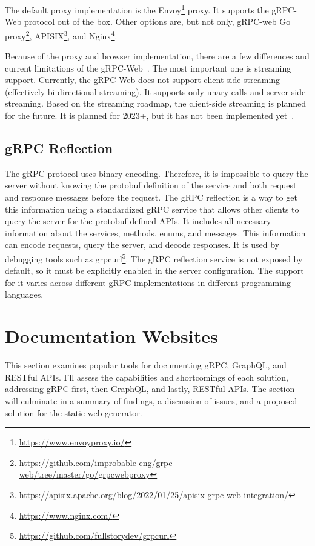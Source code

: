 The default proxy implementation is the Envoy\footnote{\url{https://www.envoyproxy.io/}} proxy.
It supports the gRPC-Web protocol out of the box.
Other options are, but not only, gRPC-web Go proxy\footnote{\url{https://github.com/improbable-eng/grpc-web/tree/master/go/grpcwebproxy}}, APISIX\footnote{\url{https://apisix.apache.org/blog/2022/01/25/apisix-grpc-web-integration/}}, and Nginx\footnote{\url{https://www.nginx.com/}}.

Because of the proxy and browser implementation, there are a few differences and current limitations of the gRPC-Web~\cite{grpc-web}.
The most important one is streaming support.
Currently, the gRPC-Web does not support client-side streaming (effectively bi-directional streaming).
It supports only unary calls and server-side streaming.
Based on the streaming roadmap, the client-side streaming is planned for the future.
It is planned for 2023+, but it has not been implemented yet~\cite{grpc-web-streaming-roadmap}.

\subsection{gRPC Reflection}
The gRPC protocol uses binary encoding.
Therefore, it is impossible to query the server without knowing the protobuf definition of the service and both request and response messages before the request.
The gRPC reflection is a way to get this information using a standardized gRPC service that allows other clients to query the server for the protobuf-defined APIs.
It includes all necessary information about the services, methods, enums, and messages.
This information can encode requests, query the server, and decode responses.
It is used by debugging tools such as grpcurl\footnote{\url{https://github.com/fullstorydev/grpcurl}}.
The gRPC reflection service is not exposed by default, so it must be explicitly enabled in the server configuration.
The support for it varies across different gRPC implementations in different programming languages.
\cite{grpc-reflection}


\section{Documentation Websites}
This section examines popular tools for documenting gRPC, GraphQL, and RESTful APIs.
I'll assess the capabilities and shortcomings of each solution, addressing gRPC first, then GraphQL, and lastly, RESTful APIs.
The section will culminate in a summary of findings, a discussion of issues, and a proposed solution for the static web generator.

